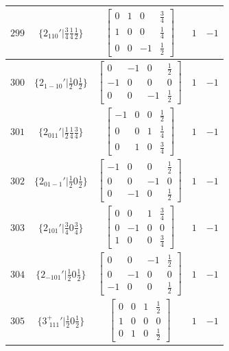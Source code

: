 \documentclass[fleqn,8pt]{jsarticle}
\begin{document}
\begin{longtable}{ccccc}
$ 299 $ & $ \{2{}_{110}{}'|\frac{3}{4} \frac{1}{4} \frac{1}{2}\} $ & $ \begin{bmatrix} 0 & 1 & 0 & \frac{3}{4} \\ 1 & 0 & 0 & \frac{1}{4} \\ 0 & 0 & -1 & \frac{1}{2} \end{bmatrix} $ & $ 1 $ & $ -1 $ \\ \hline
$ 300 $ & $ \{2{}_{1-10}{}'|\frac{1}{2} 0 \frac{1}{2}\} $ & $ \begin{bmatrix} 0 & -1 & 0 & \frac{1}{2} \\ -1 & 0 & 0 & 0 \\ 0 & 0 & -1 & \frac{1}{2} \end{bmatrix} $ & $ 1 $ & $ -1 $ \\ \hline
$ 301 $ & $ \{2{}_{011}{}'|\frac{1}{2} \frac{1}{4} \frac{3}{4}\} $ & $ \begin{bmatrix} -1 & 0 & 0 & \frac{1}{2} \\ 0 & 0 & 1 & \frac{1}{4} \\ 0 & 1 & 0 & \frac{3}{4} \end{bmatrix} $ & $ 1 $ & $ -1 $ \\ \hline
$ 302 $ & $ \{2{}_{01-1}{}'|\frac{1}{2} 0 \frac{1}{2}\} $ & $ \begin{bmatrix} -1 & 0 & 0 & \frac{1}{2} \\ 0 & 0 & -1 & 0 \\ 0 & -1 & 0 & \frac{1}{2} \end{bmatrix} $ & $ 1 $ & $ -1 $ \\ \hline
$ 303 $ & $ \{2{}_{101}{}'|\frac{3}{4} 0 \frac{3}{4}\} $ & $ \begin{bmatrix} 0 & 0 & 1 & \frac{3}{4} \\ 0 & -1 & 0 & 0 \\ 1 & 0 & 0 & \frac{3}{4} \end{bmatrix} $ & $ 1 $ & $ -1 $ \\ \hline
$ 304 $ & $ \{2{}_{-101}{}'|\frac{1}{2} 0 \frac{1}{2}\} $ & $ \begin{bmatrix} 0 & 0 & -1 & \frac{1}{2} \\ 0 & -1 & 0 & 0 \\ -1 & 0 & 0 & \frac{1}{2} \end{bmatrix} $ & $ 1 $ & $ -1 $ \\ \hline
$ 305 $ & $ \{3^{+}_{\,\,111}{}'|\frac{1}{2} 0 \frac{1}{2}\} $ & $ \begin{bmatrix} 0 & 0 & 1 & \frac{1}{2} \\ 1 & 0 & 0 & 0 \\ 0 & 1 & 0 & \frac{1}{2} \end{bmatrix} $ & $ 1 $ & $ -1 $ \\ \hline

\end{longtable}
\end{document}
